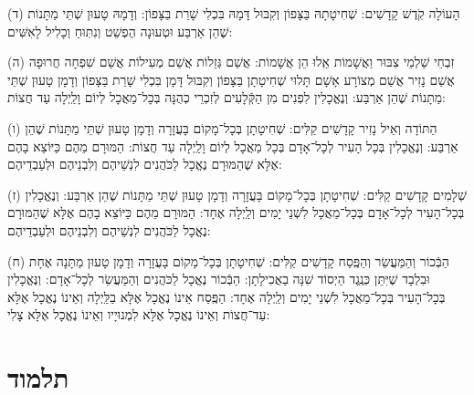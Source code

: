 (ד) הָעוֹלָה קֹֽדֶשׁ קָדָשִׁים: שְׁחִיטָתָהּ בַּצָּפוֹן וְקִבּוּל דָּמָהּ בִּכְלִי שָׁרֵת בַּצָּפוֹן: וְדָמָהּ טָעוּן שְׁתֵּי מַתָּנוֹת שֶׁהֵן אַרְבַּע וּטְעוּנָה הֶפְשֵׁט וְנִתּֽוּחַ וְכָלִיל לָאִשִּׁים: 

(ה) זִבְחֵי שַׁלְמֵי צִבּוּר וַאֲשָׁמוֹת אֵֽלוּ הֵן אֲשָׁמוֹת: אֲשַׁם גְּזֵלוֹת אֲשַׁם מְעִילוֹת אֲשַׁם שִׁפְחָה חֲרוּפָה אֲשַׁם נָזִיר אֲשַׁם מְצוֹרָע אָשָׁם תָּלוּי שְׁחִיטָתָן בַּצָּפוֹן וְקִבּוּל דָּמָן בִּכְלִי שָׁרֵת בַּצָּפוֹן וְדָמָן טָעוּן שְׁתֵּי מַתָּנוֹת שֶׁהֵן אַרְבַּע: וְנֶאֱכָלִין לִפְנִים מִן הַקְּֿלָעִים לְזִכְרֵי כְהֻנָּה בְּכָל־מַאֲכָל לְיוֹם וָלַֽיְלָה עַד חֲצוֹת: 

(ו) הַתּוֹדָה וְאֵיל נָזִיר קָדָשִׁים קַלִּים: שְׁחִיטָתָן בְּכָל־מָקוֹם בָּעֲזָרָה וְדָמָן טָעוּן שְׁתֵּי מַתָּנוֹת שֶׁהֵן אַרְבַּע: וְנֶאֱכָלִין בְּכָל הָעִיר לְכָל־אָדָם בְּכָל מַאֲכָל לְיוֹם וָלַֽיְלָה עַד חֲצוֹת: הַמּוּרָם מֵהֶם כַּיּוֹצֵא בָהֶם אֶלָּא שֶׁהַמּוּרָם נֶאֱכָל לַכֹּהֲנִים לִנְשֵׁיהֶם וְלִבְנֵיהֶם וּלְעַבְדֵיהֶם: 

(ז) שְׁלָמִים קָדָשִׁים קַלִּים: שְׁחִיטָתָן בְּכָל־מָקוֹם בָּעֲזָרָה וְדָמָן טָעוּן שְׁתֵּי מַתָּנוֹת שֶׁהֵן אַרְבַּע: וְנֶאֱכָלִין בְּכָל־הָעִיר לְכָל־אָדָם בְּכָל־מַאֲכָל לִשְׁנֵי יָמִים וְלַֽיְלָה אֶחָד: הַמּוּרָם מֵהֶם כַּיּוֹצֵא בָהֶם אֶלָּא שֶׁהַמּוּרָם נֶאֱכָל לַכֹּהֲנִים לִנְשֵׁיהֶם וְלִבְנֵיהֶם וּלְעַבְדֵיהֶם: 

(ח) הַבְּֿכוֹר וְהַמַּעֲשֵׂר וְהַפֶּֽסַח קָדָשִׁים קַלִּים: שְׁחִיטָתָן בְּכָל־מָקוֹם בָּעֲזָרָה וְדָמָן טָעוּן מַתָּנָה אֶחָת וּבִלְבָד שֶׁיִּתֵּן כְּנֶֽגֶד הַיְסוֹד שִׁנָּה בַאֲכִילָתָן: הַבְּֿכוֹר נֶאֱכָל לַכֹּהֲנִים וְהַמַּעֲשֵׂר לְכָל־אָדָם: וְנֶּאֱכָלִין בְּכָל־הָעִיר בְּכָל־מַאֲכָל לִשְׁנֵי יָמִים וְלַֽיְלָה אֶחָד: הַפֶּֽסַח אֵינוֹ נֶאֱכָל אֶלָּא בַלַּֽיְלָה וְאֵינוֹ נֶאֱכָל אֶלָּא עַד־חֲצוֹת וְאֵינוֹ נֶאֱכָל אֶלָּא לִמְנוּיָיו וְאֵינוֹ נֶאֱכָל אֶלָּא צָלִי:


\section{תלמוד}


